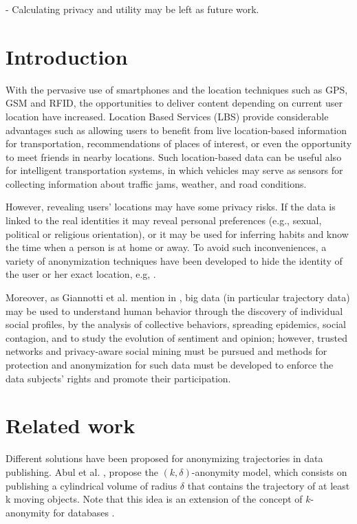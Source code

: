 \documentclass{llncs}
\begin{document}
- Calculating privacy and utility may be left as future work.





\section{Introduction}

With the pervasive use of smartphones and the location techniques such as GPS, GSM and RFID, the opportunities to deliver content depending on current user location have increased.
Location Based Services (LBS) provide considerable advantages such as allowing users to benefit from live
location-based information for transportation, recommendations of places of interest, or even the opportunity to meet friends in nearby locations. 
Such location-based data can be useful also for intelligent transportation systems, in which vehicles may serve as sensors for collecting information about traffic jams, weather, and road conditions. 


However, revealing users' locations may have some privacy risks. If the data is linked to the real identities it may reveal personal preferences (e.g., sexual, political or religious orientation), or it may be used for inferring habits and know the time when a person is at home or away.
To avoid such inconveniences, a variety of anonymization techniques have been developed to hide the identity of the user or her exact location, e.g, \cite{Terrovitis:2011}.


Moreover, as Giannotti et al. mention in \cite{Giannotti2012}, big data (in particular trajectory data) may be used  to understand human behavior through the discovery of individual social profiles, by the analysis of collective behaviors, spreading epidemics, social contagion, and to study the evolution of sentiment and opinion; however, trusted networks and privacy-aware social mining must be pursued and methods for protection and anonymization for such data must be developed to enforce the data subjects' rights and promote their participation. 

\section{Related work}
Different solutions have been proposed for anonymizing trajectories in data publishing. Abul et al. \cite{Abul2008}, propose the $(k, \delta)$-anonymity model, which consists on publishing a cylindrical volume of radius $\delta$ that contains the trajectory of at least k moving objects. Note that this idea is an extension of the concept of $k$-anonymity for databases \cite{Samarati:1998}.
\end{document}
